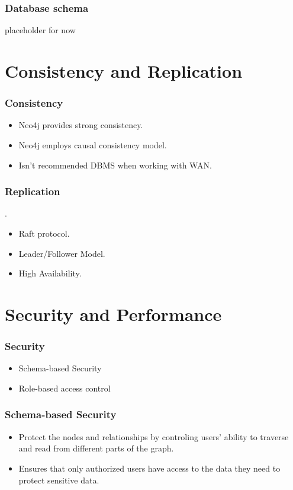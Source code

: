 \documentclass[aspectratio=169]{beamer}
\begin{document}
\begin{frame}[containsverbatim]
    \frametitle{Database schema}
    placeholder for now
\end{frame}

\section{Consistency and Replication}
\begin{frame}
    \frametitle{Consistency}
	\begin{itemize}
   		\item Neo4j provides strong consistency.
		\item Neo4j employs causal consistency model.
		\item Isn't recommended DBMS when working with WAN.
	\end{itemize}
\end{frame}

\begin{frame}
	\frametitle{Replication}.
	\begin{itemize}
		\item Raft protocol.
		\item Leader/Follower Model.
		\item High Availability.
	\end{itemize}
\end{frame}

\section{Security and Performance}

\begin{frame}
    \frametitle{Security}

    \begin{itemize}
        \item Schema-based Security 
        \item Role-based access control 
    \end{itemize}
\end{frame}

\begin{frame}
    \frametitle{Schema-based Security}
    \begin{itemize}
        \item Protect the nodes and relationships by controling users' ability to traverse and read from different parts of the graph.
        \item Ensures that only authorized users have access to the data they need to protect sensitive data.
    \end{itemize}
\end{frame}
\end{document}
